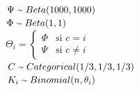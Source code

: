 \begin{minipage}[t]{\dimexpr\linewidth-5.5cm\relax}
    \raggedleft{}
\end{minipage}\hfill
\begin{minipage}[t]{0.7\textwidth}
  \begin{flushleft}
  \large
    ~\\
    $\Psi \; {\raise.17ex\hbox{$\scriptstyle\sim$}} \; Beta(1000, 1000)$\vspace*{0.3cm} \\
    $\Phi \; {\raise.17ex\hbox{$\scriptstyle\sim$}} \; Beta(1,1)$\vspace*{0.3cm} \\
    $\Theta_{i} = \left\{
	  \begin{array}{ll}
		  \Phi  & \mbox{si } c = i \\
		  \Psi & \mbox{si } c \neq i
	  \end{array}
    \right.$\vspace*{0.3cm} \\
    $C \; {\raise.17ex\hbox{$\scriptstyle\sim$}} \; Categorical(1/3,1/3,1/3)$\vspace*{0.3cm} \\
    $K_{i} \; {\raise.17ex\hbox{$\scriptstyle\sim$}} \; Binomial(n, \theta_{i})$  
  \end{flushleft}  
\end{minipage}

~\\ \\

